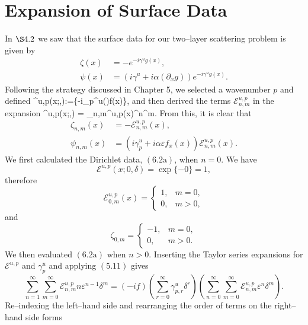 \section{Expansion of Surface Data}
\label{Sec: Expansion of Helmholtz}
In $\S 4.2$ we saw that the surface data for our two--layer scattering problem is given by
\begin{subequations}
\begin{align}
\zeta(x) & = -e^{-i \gamma^u g(x)}, 
  \label{Eqn:Govern:e} \\
\psi(x) & = (i \gamma^u + i \alpha (\partial_x g)) e^{-i \gamma^u g(x)}.
  \label{Eqn:Govern:f}
\end{align}
\end{subequations}
Following the strategy discussed in Chapter 5, we selected a wavenumber $p$ and defined
\bes
{}^{u,p}(x;\varepsilon,\delta):=\left\{-i\gamma_p^{u}(\delta)\varepsilon f(x)\right\},
\ees
and then derived the terms $\mathcal{E}_{n,m}^{u,p}$ in the expansion
\bes
{}^{u,p}(x;\varepsilon,\delta) = \sumn \sumn {}_{n,m}^{u,p}(x)\varepsilon^n\delta^m.
\ees
From this, it is clear that
\begin{subequations}
\begin{align}
\zeta_{n,m}(x) &= -\mathcal{E}_{n,m}^{u,p}(x),\\
\psi_{n,m}(x) &= \left(i\gamma_p^{u} + i\alpha\varepsilon f_x(x)\right)\mathcal{E}_{n,m}^{u,p}(x).
\end{align}
\end{subequations}
We first calculated the Dirichlet data, $(6.2\text{a})$, when $n=0$. We have
$$\mathcal{E}^{u,p}(x;0,\delta)=\operatorname{exp}\{-0\}=1,$$
therefore 
$$\mathcal{E}^{u,p}_{0,m}(x)= 
\begin{cases} 
1, & m=0, \\
0, & m>0,
\end{cases} $$
and 
$$\zeta_{0,m}= 
\begin{cases} 
-1, & m=0, \\
0, & m>0.
\end{cases}
$$
We then evaluated $(6.2\text{a})$ when $n>0$. 
Inserting the Taylor series expansions for $\mathcal{E}^{u,p}$ and $\gamma_p^{u}$ and applying $(5.11)$ gives
$$\sum_{n=1}^{\infty}\sum_{m=0}^{\infty}\mathcal{E}^{u,p}_{n,m}n\varepsilon^{n-1}\delta^m =
(-if)\left(\sum_{r=0}^{\infty}\gamma^{u}_{p,r}\delta^r\right)\left(\sum_{n=0}^{\infty}\sum_{m=0}^{\infty}\mathcal{E}^{u,p}_{n,m}\varepsilon^n\delta^m\right).$$
Re--indexing the left--hand side and rearranging the order of terms on the right--hand side forms
